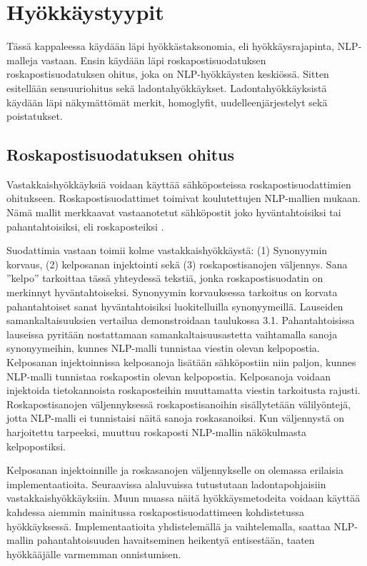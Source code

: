 \chapter{Hyökkäystyypit\label{results}}

Tässä kappaleessa käydään läpi hyökkästaksonomia, eli hyökkäysrajapinta, NLP-malleja vastaan. Ensin käydään läpi roskapostisuodatuksen roskapostisuodatuksen ohitus, joka on NLP-hyökkäysten keskiössä. Sitten esitellään sensuuriohitus sekä ladontahyökkäykset. Ladontahyökkäyksistä käydään läpi näkymättömät merkit, homoglyfit, uudelleenjärjestelyt sekä poistatukset.

\section{Roskapostisuodatuksen ohitus}
Vastakkaishyökkäyksiä voidaan käyttää sähköposteissa roskapostisuodattimien ohitukseen. Roskapostisuodattimet toimivat koulutettujen NLP-mallien mukaan. Nämä mallit merkkaavat vastaanotetut sähköpostit joko hyväntahtoisiksi tai pahantahtoisiksi, eli roskaposteiksi \citep{spamfilter}.

Suodattimia vastaan toimii kolme vastakkaishyökkäystä: (1) Synonyymin korvaus, (2) kelposanan injektointi sekä (3) roskapostisanojen väljennys. Sana ''kelpo'' tarkoittaa tässä yhteydessä tekstiä, jonka roskapostisuodatin on merkinnyt hyväntahtoiseksi. Synonyymin korvauksessa tarkoitus on korvata pahantahtoiset sanat hyväntahtoisiksi luokitelluilla synonyymeillä. Lauseiden samankaltaisuuksien vertailua demonstroidaan taulukossa 3.1. Pahantahtoisissa lauseissa pyritään nostattamaan samankaltaisuusastetta vaihtamalla sanoja synonyymeihin, kunnes NLP-malli tunnistaa viestin olevan kelpopostia. Kelposanan injektoinnissa kelposanoja lisätään sähköpostiin niin paljon, kunnes NLP-malli tunnistaa roskapostin olevan kelpopostia. Kelposanoja voidaan injektoida tietokannoista roskaposteihin muuttamatta viestin tarkoitusta rajusti. Roskapostisanojen väljennyksessä roskapostisanoihin sisällytetään välilyöntejä, jotta NLP-malli ei tunnistaisi näitä sanoja roskasanoiksi. Kun väljennystä on harjoitettu tarpeeksi, muuttuu roskaposti NLP-mallin näkökulmasta kelpopostiksi. \citep{spamfilter}

Kelposanan injektoinnille ja roskasanojen väljennykselle on olemassa erilaisia implementaatioita. Seuraavissa alaluvuissa tutustutaan ladontapohjaisiin vastakkaishyökkäyksiin. Muun muassa näitä hyökkäysmetodeita voidaan käyttää kahdessa aiemmin mainitussa roskapostisuodattimeen kohdistetussa hyökkäyksessä. Implementaatioita yhdistelemällä ja vaihtelemalla, saattaa NLP-mallin pahantahtoisuuden havaitseminen heikentyä entisestään, taaten hyökkääjälle varmemman onnistumisen.


